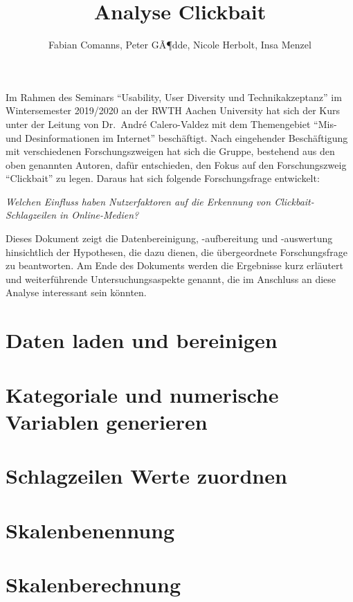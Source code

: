 \documentclass[]{article}
\title{Analyse Clickbait}
\author{Fabian Comanns, Peter GÃ¶dde, Nicole Herbolt, Insa Menzel}
\date{}
\begin{document}
\maketitle

Im Rahmen des Seminars ``Usability, User Diversity und
Technikakzeptanz'' im Wintersemester 2019/2020 an der RWTH Aachen
University hat sich der Kurs unter der Leitung von Dr.~André
Calero-Valdez mit dem Themengebiet ``Mis- und Desinformationen im
Internet'' beschäftigt. Nach eingehender Beschäftigung mit verschiedenen
Forschungszweigen hat sich die Gruppe, bestehend aus den oben genannten
Autoren, dafür entschieden, den Fokus auf den Forschungszweig
``Clickbait'' zu legen. Daraus hat sich folgende Forschungsfrage
entwickelt:

\emph{Welchen Einfluss haben Nutzerfaktoren auf die Erkennung von
Clickbait-Schlagzeilen in Online-Medien?}

Dieses Dokument zeigt die Datenbereinigung, -aufbereitung und
-auswertung hinsichtlich der Hypothesen, die dazu dienen, die
übergeordnete Forschungsfrage zu beantworten. Am Ende des Dokuments
werden die Ergebnisse kurz erläutert und weiterführende
Untersuchungsaspekte genannt, die im Anschluss an diese Analyse
interessant sein könnten.

\section{Daten laden und bereinigen}\label{daten-laden-und-bereinigen}

\section{Kategoriale und numerische Variablen
generieren}\label{kategoriale-und-numerische-variablen-generieren}

\section{Schlagzeilen Werte zuordnen}\label{schlagzeilen-werte-zuordnen}

\section{Skalenbenennung}\label{skalenbenennung}

\section{Skalenberechnung}\label{skalenberechnung}
\end{document}
